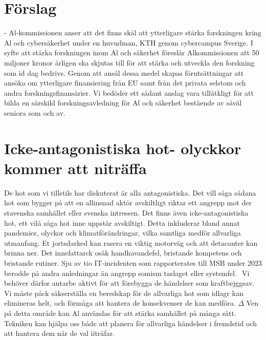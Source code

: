{\section*{Förslag}
- Al-kommissionen anser att det finns skäl att ytterligare stärka forskningen kring Al och cybersäkerhet under en huvudman, KTH genom cybercampus Sverige. I syfte att stärka forskningen inom Al och säkerhet föreslår Alkommissionen att 50 miljoner kronor årligen ska skjutas till för att stärka och utveckla den forskning som id dag bedrivs. Genom att ansål dessa medel skapas förutsättningar att ansöka om ytterligare finansiering från EU samt från det privata selstom och andra forskningsfinansärier. Vi bedöder ett sådant anslag vara tillåtkligt för att bilda en särskild forskningsavledning för Al och säkerhet bestäende av såväl seniora som och av.
\section*{Icke-antagonistiska hot- olyckkor kommer att niträffa}
De hot som vi tillstils har diskuterat är alla antagonistiska. Det vill såga sådana hot som bygger på att en allinsnad aktör avskiltligt riktar ett angrepp mot der stavenska samhället eller svenska intressen. Det finns även icke-antagonistiska hot, ett vilå såga hot inne uppstår avskiltigt. Detta inkluderar bland annat pandemier, olyckor och klimatförändringar, vilka samtliga medför allvarliga utmanfang. Et jortsdarked kan rasera en viktig motorväg och att detacanter kan brinna ner. Det innefattarck osåk handhavandefel, bristande kompetens och bristande rutiner. Sju av tio IT-incidenten som rapporterates till MSB under 2023 berodde på andra anledningar än angrepp somism taslaget eller systemfel. \({ }^{}\) Vi behöver därfor antarbe aktivt för att förebygga de händelser som kraftbejggsav. Vi måste påck såkserställa en beredskap för de allvarliga hot som idlagr kan elimineras helt, och förmåga att hantera de konsekvenser de kan medföra.
\(\Delta\) Ven på detta område kan Al användas för att stärka samhället på många sätt. Tekniken kan hjälpa oss både att planera för allvarliga händelser i fremdstid och att hantera dem när de val iiträfar.

}
